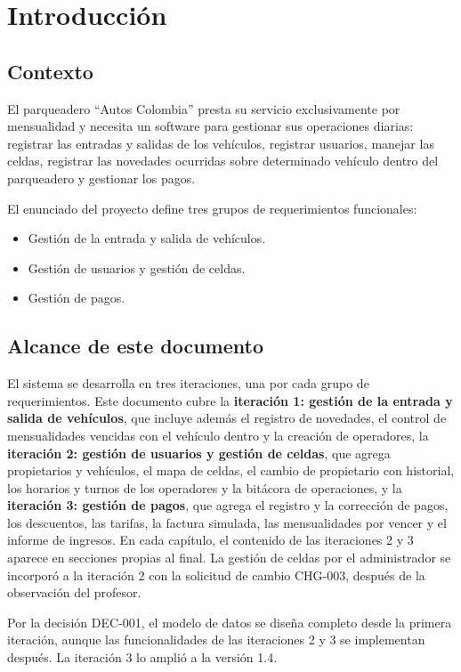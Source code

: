 \chapter{Introducción}\label{cap:introduccion}

\section{Contexto}
El parqueadero ``Autos Colombia'' presta su servicio exclusivamente por mensualidad y necesita un software para gestionar sus operaciones diarias: registrar las entradas y salidas de los vehículos, registrar usuarios, manejar las celdas, registrar las novedades ocurridas sobre determinado vehículo dentro del parqueadero y gestionar los pagos.

El enunciado del proyecto define tres grupos de requerimientos funcionales:
\begin{itemize}
  \item Gestión de la entrada y salida de vehículos.
  \item Gestión de usuarios y gestión de celdas.
  \item Gestión de pagos.
\end{itemize}

\section{Alcance de este documento}
El sistema se desarrolla en tres iteraciones, una por cada grupo de requerimientos. Este documento cubre la \textbf{iteración 1: gestión de la entrada y salida de vehículos}, que incluye además el registro de novedades, el control de mensualidades vencidas con el vehículo dentro y la creación de operadores, la \textbf{iteración 2: gestión de usuarios y gestión de celdas}, que agrega propietarios y vehículos, el mapa de celdas, el cambio de propietario con historial, los horarios y turnos de los operadores y la bitácora de operaciones, y la \textbf{iteración 3: gestión de pagos}, que agrega el registro y la corrección de pagos, los descuentos, las tarifas, la factura simulada, las mensualidades por vencer y el informe de ingresos. En cada capítulo, el contenido de las iteraciones 2 y 3 aparece en secciones propias al final. La gestión de celdas por el administrador se incorporó a la iteración 2 con la solicitud de cambio CHG-003, después de la observación del profesor.

Por la decisión DEC-001, el modelo de datos se diseña completo desde la primera iteración, aunque las funcionalidades de las iteraciones 2 y 3 se implementan después. La iteración 3 lo amplió a la versión 1.4.


